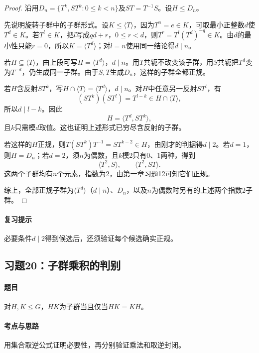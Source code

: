 \documentclass[UTF8,a4paper,11pt,fontset=windows]{ctexart}
\begin{document}
\begin{proof}
沿用$D_n=\{T^k,ST^k:0\leq k<n\}$及$ST=T^{-1}S$。设$H\leq D_n$。

先说明旋转子群中的子群形式。设$K\leq\langle T\rangle$，因为$T^n=e\in K$，可取最小正整数$d$使$T^d\in K$。若$T^l\in K$，把$l$写成$qd+r$，$0\leq r<d$，则$T^r=T^l(T^d)^{-q}\in K$。由$d$的最小性只能$r=0$，所以$K=\langle T^d\rangle$；对$l=n$使用同一结论得$d\mid n$。

若$H\subseteq\langle T\rangle$，由上段可写$H=\langle T^d\rangle$，$d\mid n$。用$T$共轭不改变该子群，用$S$共轭把$T^d$变为$T^{-d}$，仍生成同一子群。由于$S,T$生成$D_n$，这样的子群全都正规。

若$H$含反射$ST^k$，写$H\cap\langle T\rangle=\langle T^d\rangle$，$d\mid n$。对$H$中任意另一反射$ST^l$，有
\[
(ST^k)(ST^l)=T^{l-k}\in H\cap\langle T\rangle,
\]
所以$d\mid l-k$。因此
\[
H=\langle T^d,ST^k\rangle,
\]
且$k$只需模$d$取值。这也证明上述形式已穷尽含反射的子群。

若这样的$H$正规，则$T(ST^k)T^{-1}=ST^{k-2}\in H$，由刚才的判据得$d\mid2$。若$d=1$，则$H=D_n$；若$d=2$，须$n$为偶数，且$k$模2只有0、1两种，得到
\[
\langle T^2,S\rangle,\qquad\langle T^2,ST\rangle.
\]
这两个子群均有$n$个元素，指数为2，由第一章习题12可知它们正规。

综上，全部正规子群为$\langle T^d\rangle$（$d\mid n$）、$D_n$，以及$n$为偶数时另有的上述两个指数2子群。
\end{proof}

\paragraph{复习提示}
必要条件$d\mid2$得到候选后，还须验证每个候选确实正规。


\subsection{习题20：\texorpdfstring{子群乘积的判别}{子群乘积的判别}}
\label{ex:1:20}

\paragraph{题目}
对$H,K\leq G$，$HK$为子群当且仅当$HK=KH$。

\paragraph{考点与思路}
用集合取逆公式证明必要性，再分别验证乘法和取逆封闭。
\end{document}

